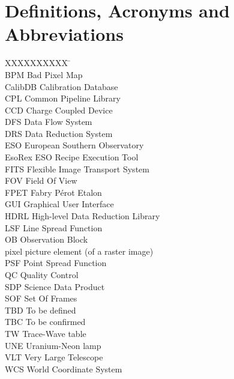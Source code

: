 \section{Definitions, Acronyms and Abbreviations}
\label{sec:acronyms}

\begin{tabbing}
XXXXXXXXXX \= \kill \\
BPM    \> Bad Pixel Map \\
CalibDB    \> Calibration Database \\
CPL        \> Common Pipeline Library \\
CCD        \> Charge Coupled Device \\
DFS        \> Data Flow System \\
DRS        \> Data Reduction System \\
ESO        \> European Southern Observatory \\
EsoRex     \> ESO Recipe Execution Tool \\
FITS       \> Flexible Image Transport System \\
FOV        \> Field Of View \\
FPET        \> Fabry Pérot Etalon \\
GUI        \> Graphical User Interface \\
HDRL        \> High-level Data Reduction Library \\
LSF        \> Line Spread Function \\
OB        \> Observation Block \\
pixel     \> picture element (of a raster image) \\
PSF       \> Point Spread Function \\
QC        \> Quality Control \\
SDP       \> Science Data Product \\
SOF       \> Set Of Frames \\
TBD       \> To be defined \\
TBC       \> To be confirmed \\
TW       \> Trace-Wave table \\
UNE        \> Uranium-Neon lamp \\
VLT       \> Very Large Telescope \\
WCS       \> World Coordinate System \\
\end{tabbing}
